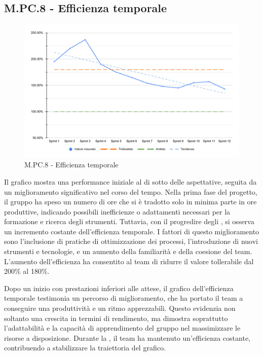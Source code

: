 \subsection{M.PC.8 - Efficienza temporale}
\begin{figure}[H]
    \centering
    \includegraphics[width=\textwidth]{assets/efficienza_temporale.pdf}
    \caption{M.PC.8 - Efficienza temporale}
\end{figure}

\par Il grafico mostra una performance iniziale al di sotto delle aspettative, seguita da un miglioramento significativo nel corso del tempo. Nella prima fase del progetto, il gruppo ha speso un numero di ore che si è tradotto solo in minima parte in ore produttive, indicando possibili inefficienze o adattamenti necessari per la formazione e ricerca degli strumenti. Tuttavia, con il progredire degli , si osserva un incremento costante dell'efficienza temporale. I fattori di questo miglioramento sono l'inclusione di pratiche di ottimizzazione dei processi, l'introduzione di nuovi strumenti e tecnologie, e un aumento della familiarità e della coesione del team. L'aumento dell'efficienza ha consentito al team di ridurre il valore tollerabile dal 200\% al 180\%.

\par Dopo un inizio con prestazioni inferiori alle attese, il grafico dell'efficienza temporale testimonia un percorso di miglioramento, che ha portato il team a conseguire una produttività e un ritmo apprezzabili. Questo evidenzia non soltanto una crescita in termini di rendimento, ma dimostra soprattutto l'adattabilità e la capacità di apprendimento del gruppo nel massimizzare le risorse a disposizione. Durante la , il team ha mantenuto un'efficienza costante, contribuendo a stabilizzare la traiettoria del grafico.
